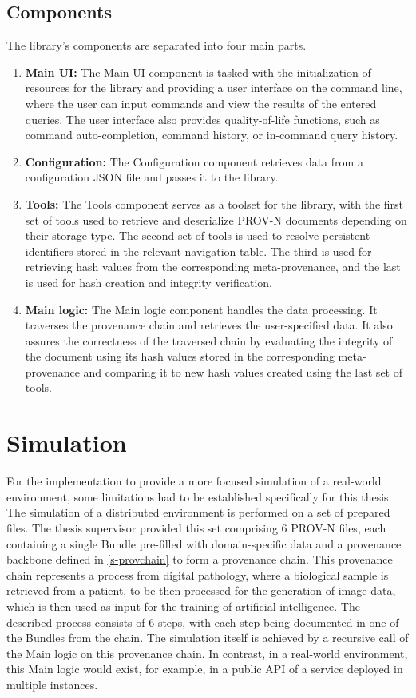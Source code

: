 \documentclass[
  digital,     %
  oneside,     %
  nosansbold,  %
  nocolorbold, %
  lof,         %
  lot,         %
]{fithesis4}
\begin{document}
\subsection{Components}
\shorthandoff{-}
The library's components are separated into four main parts.
\begin{enumerate}
    \item \textbf{Main UI:}
        The Main UI component is tasked with the initialization of resources for the library and providing a user interface on the command line, where the user can input commands and view the results of the entered queries. The user interface also provides quality-of-life functions, such as command auto-completion, command history, or in-command query history.
    \item \textbf{Configuration:}
        The Configuration component retrieves data from a configuration JSON file and passes it to the library.
    \item \textbf{Tools:}
        The Tools component serves as a toolset for the library, with the first set of tools used to retrieve and deserialize PROV-N documents depending on their storage type. 
        The second set of tools is used to resolve persistent identifiers stored in the relevant navigation table.
        The third is used for retrieving hash values from the corresponding meta-provenance, and the last is used for hash creation and integrity verification.
    \item \textbf{Main logic:}
        The Main logic component handles the data processing. It traverses the provenance chain and retrieves the user-specified data. It also assures the correctness of the traversed chain by evaluating the integrity of the document using its hash values stored in the corresponding meta-provenance and comparing it to new hash values created using the last set of tools.
\end{enumerate}
\shorthandon{-}

\section{Simulation} \label{s-simulation}
\shorthandoff{-}
For the implementation to provide a more focused simulation of a real-world environment, some limitations had to be established specifically for this thesis. The simulation of a distributed environment is performed on a set of prepared files. The thesis supervisor provided this set comprising 6 PROV-N files, each containing a single Bundle pre-filled with domain-specific data and a provenance backbone defined in \ref{s-provchain} to form a provenance chain. This provenance chain represents a process from digital pathology, where a biological sample is retrieved from a patient, to be then processed for the generation of image data, which is then used as input for the training of artificial intelligence. The described process consists of 6 steps, with each step being documented in one of the Bundles from the chain. The simulation itself is achieved by a recursive call of the Main logic on this provenance chain. In contrast, in a real-world environment, this Main logic would exist, for example, in a public API of a service deployed in multiple instances. 
\end{document}
